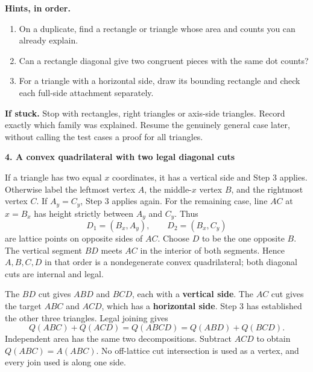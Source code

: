 \documentclass[letterpaper,11pt]{article}
\newcommand{\heading}[1]{\vspace{3pt}{\large\bfseries #1}\par}
\newcommand{\subhead}[1]{\vspace{2pt}\textbf{#1}\par}
\newcommand{\hints}[3]{\textbf{Hints, in order.}\begin{enumerate}\item #1\item #2\item #3\end{enumerate}}
\begin{document}
\hints{On a duplicate, find a rectangle or triangle whose area and counts you can already explain.}{Can a rectangle diagonal give two congruent pieces with the same dot counts?}{For a triangle with a horizontal side, draw its bounding rectangle and check each full-side attachment separately.}
\textbf{If stuck.} Stop with rectangles, right triangles or axis-side triangles. Record exactly which family was explained. Resume the genuinely general case later, without calling the test cases a proof for all triangles.
\newpage

\heading{Problem 8, continued / the general triangle and polygon}
\subhead{4. A convex quadrilateral with two legal diagonal cuts}
If a triangle has two equal $x$ coordinates, it has a vertical side and Step 3 applies. Otherwise label the leftmost vertex $A$, the middle-$x$ vertex $B$, and the rightmost vertex $C$. If $A_y=C_y$, Step 3 applies again. For the remaining case, line $AC$ at $x=B_x$ has height strictly between $A_y$ and $C_y$. Thus
\[D_1=(B_x,A_y),\qquad D_2=(B_x,C_y)\]
are lattice points on opposite sides of $AC$. Choose $D$ to be the one opposite $B$. The vertical segment $BD$ meets $AC$ in the interior of both segments. Hence $A,B,C,D$ in that order is a nondegenerate convex quadrilateral; both diagonal cuts are internal and legal.

The $BD$ cut gives $ABD$ and $BCD$, each with a \textbf{vertical side}. The $AC$ cut gives the target $ABC$ and $ACD$, which has a \textbf{horizontal side}. Step 3 has established the other three triangles. Legal joining gives
\[Q(ABC)+Q(ACD)=Q(ABCD)=Q(ABD)+Q(BCD).\]
Independent area has the same two decompositions. Subtract $ACD$ to obtain $Q(ABC)=A(ABC)$. No off-lattice cut intersection is used as a vertex, and every join used is along one side.
\end{document}
